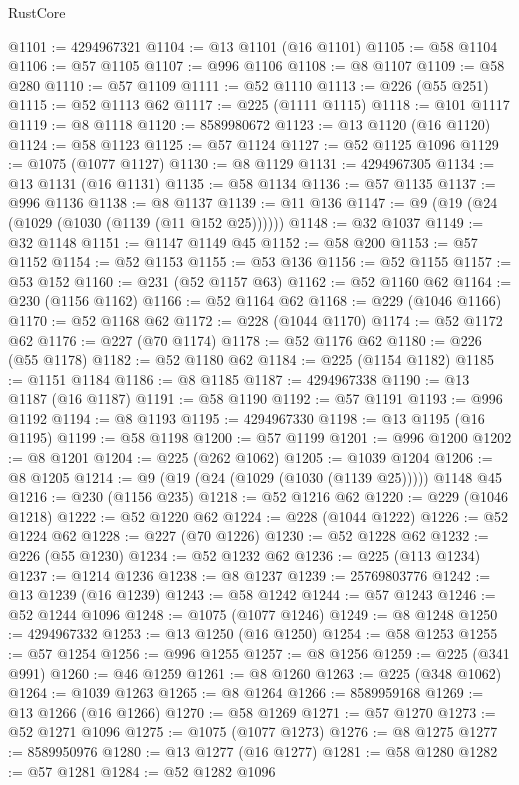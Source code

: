 \begin{lexlean}{RustCore}
\begin{coremodule}
@1101 := 4294967321
@1104 := @13 @1101 (@16 @1101)
@1105 := @58 @1104
@1106 := @57 @1105
@1107 := @996 @1106
@1108 := @8 @1107
@1109 := @58 @280
@1110 := @57 @1109
@1111 := @52 @1110
@1113 := @226 (@55 @251)
@1115 := @52 @1113 @62
@1117 := @225 (@1111 @1115)
@1118 := @101 @1117
@1119 := @8 @1118
@1120 := 8589980672
@1123 := @13 @1120 (@16 @1120)
@1124 := @58 @1123
@1125 := @57 @1124
@1127 := @52 @1125 @1096
@1129 := @1075 (@1077 @1127)
@1130 := @8 @1129
@1131 := 4294967305
@1134 := @13 @1131 (@16 @1131)
@1135 := @58 @1134
@1136 := @57 @1135
@1137 := @996 @1136
@1138 := @8 @1137
@1139 := @11 @136
@1147 := @9 (@19 (@24 (@1029 (@1030 (@1139 (@11 @152 @25))))))
@1148 := @32 @1037
@1149 := @32 @1148
@1151 := @1147 @1149 @45
@1152 := @58 @200
@1153 := @57 @1152
@1154 := @52 @1153
@1155 := @53 @136
@1156 := @52 @1155
@1157 := @53 @152
@1160 := @231 (@52 @1157 @63)
@1162 := @52 @1160 @62
@1164 := @230 (@1156 @1162)
@1166 := @52 @1164 @62
@1168 := @229 (@1046 @1166)
@1170 := @52 @1168 @62
@1172 := @228 (@1044 @1170)
@1174 := @52 @1172 @62
@1176 := @227 (@70 @1174)
@1178 := @52 @1176 @62
@1180 := @226 (@55 @1178)
@1182 := @52 @1180 @62
@1184 := @225 (@1154 @1182)
@1185 := @1151 @1184
@1186 := @8 @1185
@1187 := 4294967338
@1190 := @13 @1187 (@16 @1187)
@1191 := @58 @1190
@1192 := @57 @1191
@1193 := @996 @1192
@1194 := @8 @1193
@1195 := 4294967330
@1198 := @13 @1195 (@16 @1195)
@1199 := @58 @1198
@1200 := @57 @1199
@1201 := @996 @1200
@1202 := @8 @1201
@1204 := @225 (@262 @1062)
@1205 := @1039 @1204
@1206 := @8 @1205
@1214 := @9 (@19 (@24 (@1029 (@1030 (@1139 @25))))) @1148 @45
@1216 := @230 (@1156 @235)
@1218 := @52 @1216 @62
@1220 := @229 (@1046 @1218)
@1222 := @52 @1220 @62
@1224 := @228 (@1044 @1222)
@1226 := @52 @1224 @62
@1228 := @227 (@70 @1226)
@1230 := @52 @1228 @62
@1232 := @226 (@55 @1230)
@1234 := @52 @1232 @62
@1236 := @225 (@113 @1234)
@1237 := @1214 @1236
@1238 := @8 @1237
@1239 := 25769803776
@1242 := @13 @1239 (@16 @1239)
@1243 := @58 @1242
@1244 := @57 @1243
@1246 := @52 @1244 @1096
@1248 := @1075 (@1077 @1246)
@1249 := @8 @1248
@1250 := 4294967332
@1253 := @13 @1250 (@16 @1250)
@1254 := @58 @1253
@1255 := @57 @1254
@1256 := @996 @1255
@1257 := @8 @1256
@1259 := @225 (@341 @991)
@1260 := @46 @1259
@1261 := @8 @1260
@1263 := @225 (@348 @1062)
@1264 := @1039 @1263
@1265 := @8 @1264
@1266 := 8589959168
@1269 := @13 @1266 (@16 @1266)
@1270 := @58 @1269
@1271 := @57 @1270
@1273 := @52 @1271 @1096
@1275 := @1075 (@1077 @1273)
@1276 := @8 @1275
@1277 := 8589950976
@1280 := @13 @1277 (@16 @1277)
@1281 := @58 @1280
@1282 := @57 @1281
@1284 := @52 @1282 @1096

\end{coremodule}
\end{lexlean}
